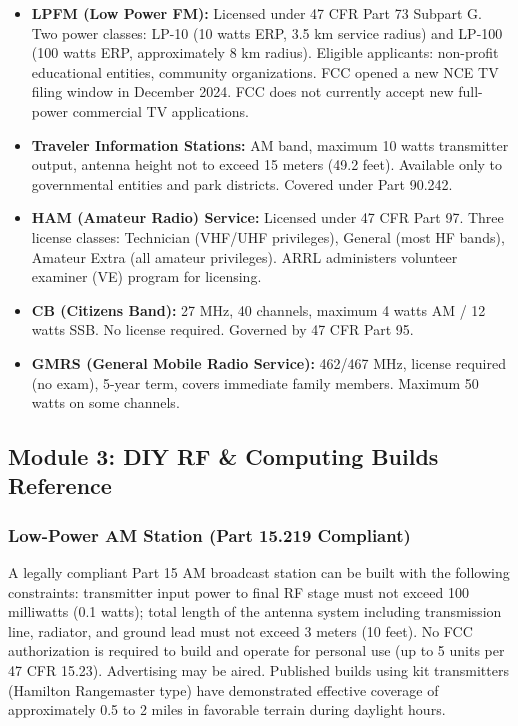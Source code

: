 \documentclass[11pt,letterpaper]{article}
\begin{document}
\begin{itemize}
  \item \textbf{LPFM (Low Power FM):} Licensed under 47 CFR Part 73 Subpart G. Two power classes: LP-10 (10 watts ERP, 3.5 km service radius) and LP-100 (100 watts ERP, approximately 8 km radius). Eligible applicants: non-profit educational entities, community organizations. FCC opened a new NCE TV filing window in December 2024. FCC does not currently accept new full-power commercial TV applications.
  \item \textbf{Traveler Information Stations:} AM band, maximum 10 watts transmitter output, antenna height not to exceed 15 meters (49.2 feet). Available only to governmental entities and park districts. Covered under Part 90.242.
  \item \textbf{HAM (Amateur Radio) Service:} Licensed under 47 CFR Part 97. Three license classes: Technician (VHF/UHF privileges), General (most HF bands), Amateur Extra (all amateur privileges). ARRL administers volunteer examiner (VE) program for licensing.
  \item \textbf{CB (Citizens Band):} 27 MHz, 40 channels, maximum 4 watts AM / 12 watts SSB. No license required. Governed by 47 CFR Part 95.
  \item \textbf{GMRS (General Mobile Radio Service):} 462/467 MHz, license required (no exam), 5-year term, covers immediate family members. Maximum 50 watts on some channels.
\end{itemize}

\subsection{Module 3: DIY RF \& Computing Builds Reference}

\subsubsection{Low-Power AM Station (Part 15.219 Compliant)}

A legally compliant Part 15 AM broadcast station can be built with the following constraints: transmitter input power to final RF stage must not exceed 100 milliwatts (0.1 watts); total length of the antenna system including transmission line, radiator, and ground lead must not exceed 3 meters (10 feet). No FCC authorization is required to build and operate for personal use (up to 5 units per 47 CFR 15.23). Advertising may be aired. Published builds using kit transmitters (Hamilton Rangemaster type) have demonstrated effective coverage of approximately 0.5 to 2 miles in favorable terrain during daylight hours.
\end{document}
